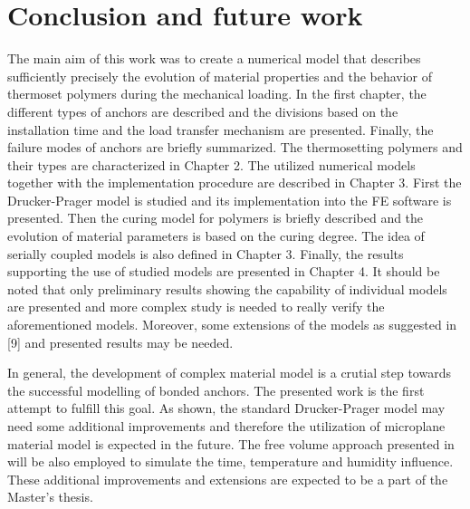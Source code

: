 \thispagestyle{plain}
\section*{Conclusion and future work}
\indent

The main aim of this work was to create a numerical model that describes sufficiently precisely the evolution of material properties and the behavior of thermoset polymers during the mechanical loading. In the first chapter, the different types of anchors are described and the divisions based on the installation time and the load transfer mechanism are presented. Finally, the failure modes of anchors are briefly summarized. The thermosetting polymers and their types are characterized in Chapter 2. The utilized numerical models together with the implementation procedure are described in Chapter 3. First the Drucker-Prager model is studied and its implementation into the FE software is presented. Then the curing model for polymers is briefly described and the evolution of material parameters is based on the curing degree. The idea of serially coupled models is also defined in Chapter 3. Finally, the results supporting the use of studied models are presented in Chapter 4. It should be noted that only preliminary results showing the capability of individual models are presented and more complex study is needed to really verify the aforementioned models. Moreover, some extensions of the models as suggested in [9] and presented results may be needed. 

In general, the development of complex material model is a crutial step towards the successful modelling of bonded anchors. The presented work is the first attempt to fulfill this goal. As shown, the standard Drucker-Prager model may need some additional improvements and therefore the utilization of microplane material model \cite{di2007symmetric} is expected in the future. The free volume approach presented in \cite{popelar1997multiaxial} will be also employed to simulate the time, temperature and humidity influence. These additional improvements and extensions are expected to be a part of the Master’s thesis.
